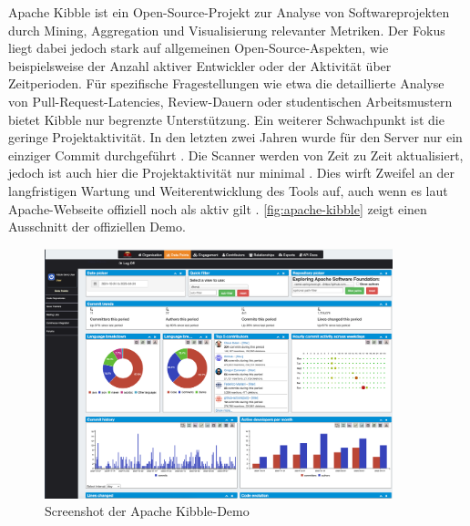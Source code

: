 Apache Kibble ist ein Open-Source-Projekt zur Analyse von Softwareprojekten \linebreak durch Mining, Aggregation und Visualisierung relevanter Metriken. Der Fokus liegt dabei jedoch stark auf allgemeinen Open-Source-Aspekten, wie beispielsweise der Anzahl aktiver Entwickler oder der Aktivität über Zeitperioden. Für spezifische Fragestellungen wie etwa die detaillierte Analyse von Pull-Request-Latencies, Review-Dauern oder studentischen Arbeitsmustern bietet Kibble nur begrenzte Unterstützung. Ein weiterer Schwachpunkt ist die geringe Projektaktivität. In den letzten zwei Jahren wurde für den Server nur ein einziger Commit durchgeführt \parencite{noauthor_apachekibble-1_2025}. Die Scanner werden von Zeit zu Zeit aktualisiert, jedoch ist auch hier die Projektaktivität nur minimal \parencite{noauthor_apachekibble-scanners_2024}. Dies wirft Zweifel an der langfristigen Wartung und Weiterentwicklung des Tools auf, auch wenn es laut Apache-Webseite offiziell noch als aktiv gilt \parencite{noauthor_apache_nodate}. \autoref{fig:apache-kibble} zeigt einen Ausschnitt der offiziellen Demo. \parencite{sally_apache_2018}\parencite{noauthor_setting_nodate}
\begin{figure}[htbp]
    \centering
    \includegraphics[width=0.9\textwidth]{Figures/apache-kibble.png}
    \caption{Screenshot der Apache Kibble-Demo \parencite{noauthor_code_nodate}}
    \label{fig:apache-kibble}
\end{figure}


